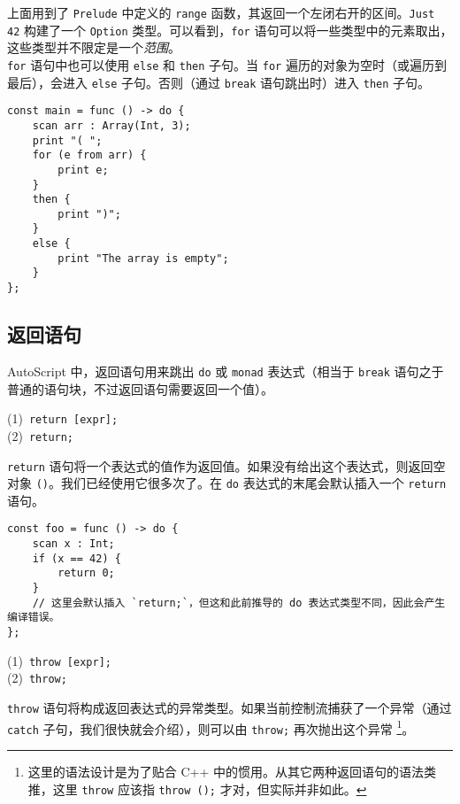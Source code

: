 上面用到了 \lstinline!Prelude! 中定义的 \lstinline!range! 函数，其返回一个左闭右开的区间。\lstinline!Just 42! 构建了一个 \lstinline!Option! 类型。可以看到，\lstinline!for! 语句可以将一些类型中的元素取出，这些类型并不限定是一个\emph{范围}。 \\

\lstinline!for! 语句中也可以使用 \lstinline!else! 和 \lstinline!then! 子句。当 \lstinline!for! 遍历的对象为空时（或遍历到最后），会进入 \lstinline!else! 子句。否则（通过 \lstinline!break! 语句跳出时）进入 \lstinline!then! 子句。

\begin{lstlisting}
const main = func () -> do {
	scan arr : Array(Int, 3);
	print "( ";
    for (e from arr) {
        print e;
    }
    then {
    	print ")";
    }
    else {
        print "The array is empty";
    }
};
\end{lstlisting}

\subsection{返回语句}

AutoScript 中，返回语句用来跳出 \lstinline!do! 或 \lstinline!monad! 表达式（相当于 \lstinline!break! 语句之于普通的语句块，不过返回语句需要返回一个值）。

\begin{grammar} \label{grm:return-statement}
    (1)\ \lstinline!return [expr];! \\
    (2)\ \lstinline!return;!
\end{grammar}

\lstinline!return! 语句将一个表达式的值作为返回值。如果没有给出这个表达式，则返回空对象 \lstinline!()!。我们已经使用它很多次了。在 \lstinline!do! 表达式的末尾会默认插入一个 \lstinline!return! 语句。

\begin{lstlisting}
const foo = func () -> do {
	scan x : Int;
	if (x == 42) {
		return 0;
	}
	// 这里会默认插入 `return;`，但这和此前推导的 do 表达式类型不同，因此会产生编译错误。
};
\end{lstlisting}

\begin{grammar} \label{grm:throw-statement}
    (1)\ \lstinline!throw [expr];! \\
    (2)\ \lstinline!throw;!
\end{grammar}

\lstinline!throw! 语句将构成返回表达式的异常类型。如果当前控制流捕获了一个异常（通过 \lstinline!catch! 子句，我们很快就会介绍），则可以由 \lstinline!throw;! 再次抛出这个异常 \footnote{这里的语法设计是为了贴合 C++ 中的惯用。从其它两种返回语句的语法类推，这里 \lstinline!throw! 应该指 \lstinline!throw ();! 才对，但实际并非如此。}。

